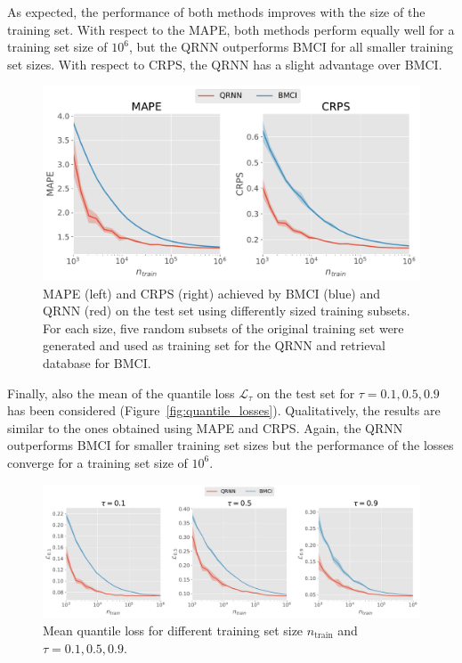 \documentclass[journal abbreviation, manuscript]{copernicus}
\begin{document}
As expected, the performance of both methods improves with the size of the
training set. With respect to the MAPE, both methods perform equally well for a
training set size of $10^6$, but the QRNN outperforms BMCI for all smaller
training set sizes. With respect to CRPS, the QRNN has a slight advantage
over BMCI.

  \begin{figure}[hbpt!]
    \centering
    \includegraphics[width = 0.8\linewidth]{../plots/mape_crps}
    \caption{MAPE (left) and CRPS (right) achieved by BMCI (blue) and QRNN (red)
      on the test set using differently sized training subsets. For each size,
      five random subsets of the original training set were generated and used
      as training set for the QRNN and retrieval database for BMCI.}
    \label{fig:mape_crps}
  \end{figure}

Finally, also the mean of the quantile loss $\mathcal{L}_\tau$ on the test set
for $\tau = 0.1, 0.5, 0.9$ has been considered
(Figure~\ref{fig:quantile_losses}). Qualitatively, the results are similar to
the ones obtained using MAPE and CRPS. Again, the QRNN outperforms BMCI for
smaller training set sizes but the performance of the losses converge for
a training set size of $10^6$.

  \begin{figure}[hbpt!]
    \centering
    \includegraphics[width = 0.8\linewidth]{../plots/quantile_losses}
    \caption{Mean quantile loss for different training set size $n_\text{train}$ and
    $\tau = 0.1, 0.5, 0.9$.}
    \label{fig:mape_crps}
  \end{figure}
\end{document}
